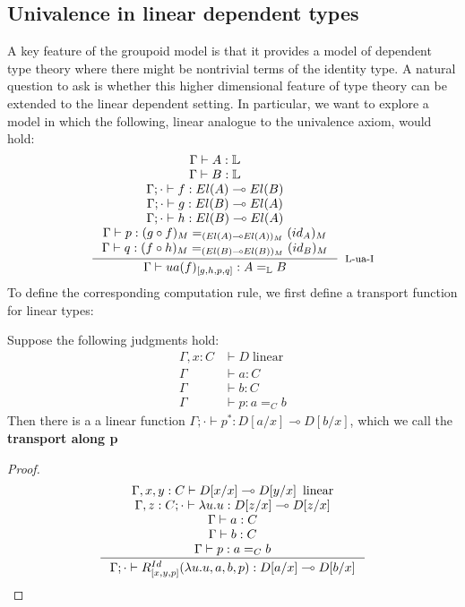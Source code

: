 \documentclass[a4paper,english]{lipics-v2018}
\DeclareMathOperator{\linear}{\text{ linear}}
\begin{document}
\subsection{Univalence in linear dependent types}\label{highermodel}
A key feature of the groupoid model is that it provides a model of dependent type theory where there might be nontrivial terms of the identity type. A natural question to ask is whether this higher dimensional feature of type theory can be extended to the linear dependent setting.
In particular, we want to explore a model in which the following, linear analogue to the univalence axiom, would hold:
\[
  \inference{
    \Gamma \vdash A : \mathbb{L}\\
    \Gamma \vdash B : \mathbb{L}\\
    \Gamma; \cdot \vdash f : El(A) \multimap El(B)\\
    \Gamma; \cdot \vdash g : El(B) \multimap El(A)\\
    \Gamma; \cdot \vdash h : El(B) \multimap El(A)\\
    \Gamma \vdash p : (g \circ f)_M  =_{(El(A) \multimap El(A))_M} (id_A)_M\\
    \Gamma \vdash q : (f \circ h)_M =_{(El(B) \multimap El(B))_M} (id_B)_M\\
    }{\Gamma \vdash ua(f)_{[g, h, p, q]} : A =_{\mathbb{L}} B}[L-ua-I]
  \]
  To define the corresponding computation rule, we first define a transport function for linear types:
  \begin{lemma}
    Suppose the following judgments hold:
    \[
      \begin{split}
        \Gamma, x : C &\vdash D \linear\\
        \Gamma &\vdash a : C\\
        \Gamma &\vdash b : C\\
        \Gamma &\vdash p : a =_C b
        \end{split}
      \]
      Then there is a a linear function $\Gamma; \cdot \vdash p^* : D[a/x] \multimap D[b/x]$, which we call the \textbf{transport along p}
      \begin{proof}
        \[
          \inference{
\Gamma, x, y : C \vdash D[x/x] \multimap D[y/x] \linear\\
\Gamma, z : C ; \cdot \vdash \lambda u.u :D[z/x] \multimap D[z/x]\\
\Gamma \vdash a : C\\
\Gamma \vdash b : C\\
\Gamma \vdash p : a=_C b
}
{\Gamma; \cdot \vdash R^{Id}_{[x, y, p]}(\lambda u.u, a, b, p) : D[a/x] \multimap D[b/x]}
\]
      \end{proof}
    \end{lemma}
\end{document}
